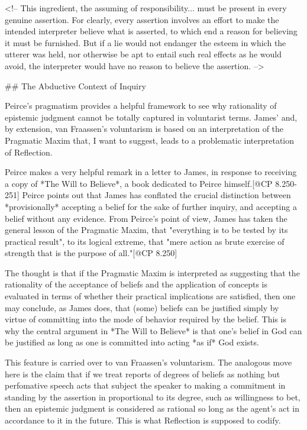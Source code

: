 \textless{}!-- This ingredient, the assuming of responsibility... must
be present in every genuine assertion. For clearly, every assertion
involves an effort to make the intended interpreter believe what is
asserted, to which end a reason for believing it must be furnished. But
if a lie would not endanger the esteem in which the utterer was held,
nor otherwise be apt to entail such real effects as he would avoid, the
interpreter would have no reason to believe the assertion.
--\textgreater{}

\#\# The Abductive Context of Inquiry

Peirce's pragmatism provides a helpful framework to see why rationality
of epistemic judgment cannot be totally captured in voluntarist terms.
James' and, by extension, van Fraassen's voluntarism is based on an
interpretation of the Pragmatic Maxim that, I want to suggest, leads to
a problematic interpretation of Reflection.

Peirce makes a very helpful remark in a letter to James, in response to
receiving a copy of *The Will to Believe*, a book dedicated to Peirce
himself.{[}@CP 8.250-251{]} Peirce points out that James has conflated
the crucial distinction between *provisionally* accepting a belief for
the sake of further inquiry, and accepting a belief without any
evidence. From Peirce's point of view, James has taken the general
lesson of the Pragmatic Maxim, that "everything is to be tested by its
practical result", to its logical extreme, that "mere action as brute
exercise of strength that is the purpose of all."{[}@CP 8.250{]}

The thought is that if the Pragmatic Maxim is interpreted as suggesting
that the rationality of the acceptance of beliefs and the application of
concepts is evaluated in terms of whether their practical implications
are satisfied, then one may conclude, as James does, that (some) beliefs
can be justified simply by virtue of committing into the mode of
behavior required by the belief. This is why the central argument in
*The Will to Believe* is that one's belief in God can be justified as
long as one is committed into acting *as if* God exists.

This feature is carried over to van Fraassen's voluntarism. The
analogous move here is the claim that if we treat reports of degrees of
beliefs as nothing but perfomative speech acts that subject the speaker
to making a commitment in standing by the assertion in proportional to
its degree, such as willingness to bet, then an epistemic judgment is
considered as rational so long as the agent's act in accordance to it in
the future. This is what Reflection is supposed to codify.

